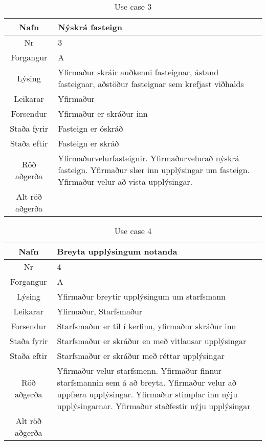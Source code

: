 \begin{table}[h!]\centering
\begin{tabular}{|c|p{10cm}|}
\hline
Nafn&Nýskrá fasteign\\
\hline
Nr&3\\
\hline
Forgangur&A\\
\hline
Lýsing&Yfirmaður skráir auðkenni fasteignar, ástand fasteignar, aðstöður fasteignar sem krefjast viðhalds\\
\hline
Leikarar&Yfirmaður\\
\hline
Forsendur&Yfirmaður er skráður inn\\
\hline
Staða fyrir&Fasteign er óskráð\\
\hline
Staða eftir&Fasteign er skráð\\
\hline
Röð aðgerða&Yfirmaðurvelurfasteignir. Yfirmaðurvelurað nýskrá fasteign. Yfirmaður slær inn upplýsingar um fasteign. Yfirmaður velur að vista upplýsingar.\\
\hline
Alt röð aðgerða&\\
\hline
\end{tabular}
\caption{Use case 3}\label{tab:use_case_3}
\end{table}
\begin{table}[h!]\centering
\begin{tabular}{|c|p{10cm}|}
\hline
Nafn&Breyta upplýsingum notanda\\
\hline
Nr&4\\
\hline
Forgangur&A\\
\hline
Lýsing&Yfirmaður breytir upplýsingum um starfsmann\\
\hline
Leikarar&Yfirmaður, Starfsmaður\\
\hline
Forsendur&Starfsmaður er til í kerfinu, yfirmaður skráður inn\\
\hline
Staða fyrir&Starfsmaður er skráður en með vitlausar upplýsingar\\
\hline
Staða eftir&Starfsmaður er skráður með réttar upplýsingar\\
\hline
Röð aðgerða&Yfirmaður velur starfsmenn. Yfirmaður finnur starfsmannin sem á að breyta. Yfirmaður velur að uppfæra upplýsingar. Yfirmaður stimplar inn nýju upplýsingarnar. Yfirmaður staðfestir nýju upplýsingar\\
\hline
Alt röð aðgerða&\\
\hline
\end{tabular}
\caption{Use case 4}\label{tab:use_case_4}
\end{table}
